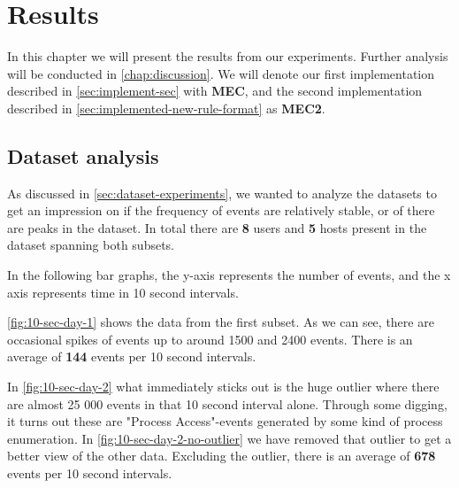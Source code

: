 \chapter{Results}
\label{chap:results}
In this chapter we will present the results from our experiments. Further analysis will be conducted in \cref{chap:discussion}. We will denote our first implementation described in \cref{sec:implement-sec} with \textbf{MEC}, and the second implementation described in \cref{sec:implemented-new-rule-format} as \textbf{MEC2}.

\section{Dataset analysis}
\label{sec:dataset-analysiss}

As discussed in \cref{sec:dataset-experiments}, we wanted to analyze the datasets to get an impression on if the frequency of events are relatively stable, or of there are peaks in the dataset.
In total there are \textbf{8} users and \textbf{5} hosts present in the dataset spanning both subsets.

In the following bar graphs, the y-axis represents the number of events, and the x axis represents time in 10 second intervals.

\cref{fig:10-sec-day-1} shows the data from the first subset. As we can see, there are occasional spikes of events up to around 1500 and 2400 events. There is an average of \textbf{144} events per 10 second intervals.

In \cref{fig:10-sec-day-2} what immediately sticks out is the huge outlier where there are almost 25 000 events in that 10 second interval alone. Through some digging, it turns out these are "Process Access"-events generated by some kind of process enumeration. In 
\cref{fig:10-sec-day-2-no-outlier} we have removed that outlier to get a better view of the other data. Excluding the outlier, there is an average of \textbf{678} events per 10 second intervals.

